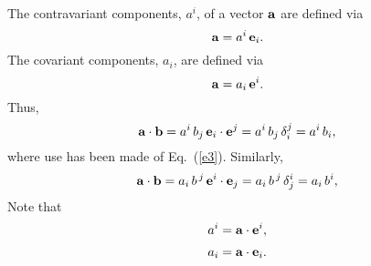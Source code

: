\documentclass[12pt,prb,aps,notitlepage]{revtex4-1}
\begin{document}
 The contravariant components, $a^i$,  of a vector ${\bf a}$ are defined via
 \begin{equation}
 {\bf a} = a^i\,{\bf e}_i.
 \end{equation}
 The covariant components, $a_i$, are defined via
 \begin{equation}
  {\bf a} = a_i\,{\bf e}^i.
  \end{equation}
  Thus,
  \begin{equation}
  {\bf a}\cdot{\bf b} = a^i\,b_j\,{\bf e}_i\cdot{\bf e}^j = a^i\,b_j\,\delta_i^j = a^i\,b_i,
  \end{equation}
  where use has been made of Eq.~(\ref{e3}). 
  Similarly, 
  \begin{equation}
  {\bf a}\cdot{\bf b} = a_i\,b^{\,j}\,{\bf e}^i\cdot{\bf e}_j = a_i\,b^{\,j}\,\delta^i_j = a_i\,b^i,
  \end{equation}
  Note that
  \begin{align}
  a^i &= {\bf a}\cdot{\bf e}^i,\\[0.5ex]
  a_i &= {\bf a}\cdot{\bf e}_i.
    \end{align}
    
\end{document}
